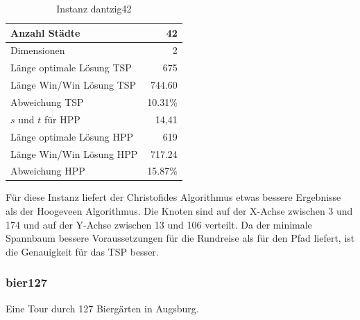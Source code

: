 \documentclass[11pt,a4paper]{article}
\begin{document}
        \begin{table}[H]
                \centering
                \begin{tabular}{| l | r |}
                    \hline
                        Anzahl Städte               & 42            \\ \hline
                        Dimensionen                 & 2             \\ \hline
                        Länge optimale Lösung TSP   & 675           \\ \hline
                        Länge Win/Win Lösung  TSP   & 744.60        \\ \hline
                        Abweichung TSP              & 10.31\%       \\ \hline
                        $s$ und $t$ für HPP         & 14,41         \\ \hline
                        Länge optimale Lösung HPP   & 619           \\ \hline
                        Länge Win/Win Lösung  HPP   & 717.24        \\ \hline
                        Abweichung HPP              & 15.87\%       \\ \hline
                \end{tabular}
                \caption{Instanz dantzig42}
                \label{tab:dantzig42}
        \end{table}

Für diese Instanz liefert der Christofides Algorithmus etwas bessere Ergebnisse als der Hoogeveen Algorithmus. Die Knoten sind auf der X-Achse zwischen 3 und 174 und auf der Y-Achse zwischen 13 und 106 verteilt. Da der minimale Spannbaum bessere Voraussetzungen für die Rundreise als für den Pfad liefert, ist die Genauigkeit für das TSP besser.

\newpage

\subsubsection{bier127}
Eine Tour durch 127 Biergärten in Augsburg.
\end{document}
